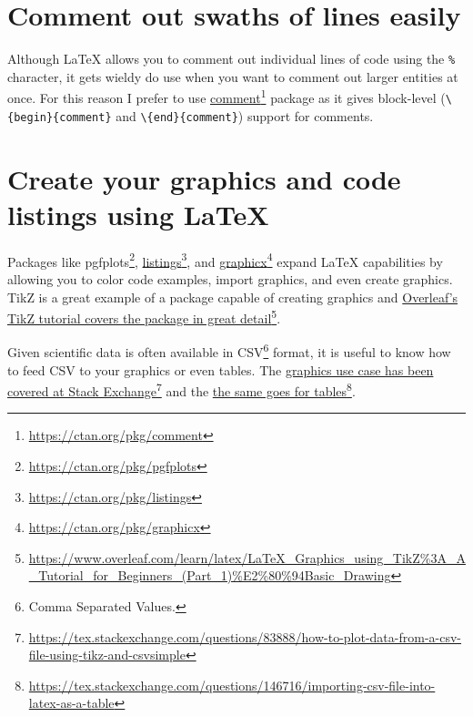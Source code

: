 \section{Comment out swaths of lines easily}

Although LaTeX allows you to comment out individual lines of code using the \texttt{\%} character, it gets wieldy do use when you want to comment out larger entities at once.
For this reason I prefer to use \href{https://ctan.org/pkg/comment}{comment}\footnote{\url{https://ctan.org/pkg/comment}} package as it gives block-level (\texttt{\textbackslash \{begin\}\{comment\}} and \texttt{\textbackslash \{end\}\{comment\}}) support for comments.



\section{Create your graphics and code listings using LaTeX}

Packages like {pgfplots}\footnote{\url{https://ctan.org/pkg/pgfplots}}, \href{https://ctan.org/pkg/listings}{listings}\footnote{\url{https://ctan.org/pkg/listings}}, and \href{https://ctan.org/pkg/graphicx}{graphicx}\footnote{\url{https://ctan.org/pkg/graphicx}} expand LaTeX capabilities by allowing you to color code examples, import graphics, and even create graphics.
TikZ is a great example of a package capable of creating graphics and \href{https://www.overleaf.com/learn/latex/LaTeX_Graphics_using_TikZ\%3A_A_Tutorial_for_Beginners_(Part_1)\%E2\%80\%94Basic_Drawing}{Overleaf's TikZ tutorial covers the package in great detail}\footnote{\url{https://www.overleaf.com/learn/latex/LaTeX_Graphics_using_TikZ\%3A_A_Tutorial_for_Beginners_(Part_1)\%E2\%80\%94Basic_Drawing}}.

Given scientific data is often available in CSV\footnote{Comma Separated Values.} format, it is useful to know how to feed CSV to your graphics or even tables. The \href{https://tex.stackexchange.com/questions/83888/how-to-plot-data-from-a-csv-file-using-tikz-and-csvsimple}{graphics use case has been covered at Stack Exchange}\footnote{\url{https://tex.stackexchange.com/questions/83888/how-to-plot-data-from-a-csv-file-using-tikz-and-csvsimple}} and the \href{https://tex.stackexchange.com/questions/146716/importing-csv-file-into-latex-as-a-table}{the same goes for tables}\footnote{\url{https://tex.stackexchange.com/questions/146716/importing-csv-file-into-latex-as-a-table}}.

